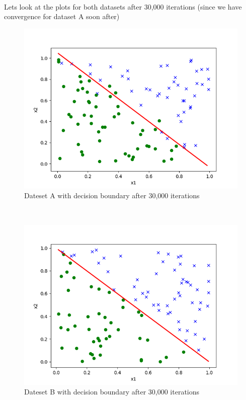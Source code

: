 \begin{answer}\\
Lets look at the plots for both datasets after 30,000 iterations (since we have convergence for dataset A soon after)\\
\begin{figure}
  \includegraphics[width=\linewidth]{../src/output/A_30000.png}
  \caption{Dateset A with decision boundary after 30,000 iterations}
  \label{fig:Dateset A with decision boundary after 30,000 iterations}
\end{figure}\\
\begin{figure}
  \includegraphics[width=\linewidth]{../src/output/B_30000.png}
  \caption{Dateset B with decision boundary after 30,000 iterations}

\end{figure}
\end{answer}
